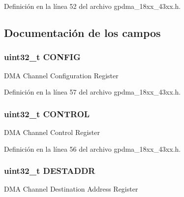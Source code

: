 Definición en la línea 52 del archivo gpdma\+\_\+18xx\+\_\+43xx.\+h.



\subsection{Documentación de los campos}
\subsubsection[{\texorpdfstring{C\+O\+N\+F\+IG}{CONFIG}}]{ uint32\+\_\+t C\+O\+N\+F\+IG}\hypertarget{struct_g_p_d_m_a___c_h___t_aed40378e2ce292435df51ff247d0cb78}{}\label{struct_g_p_d_m_a___c_h___t_aed40378e2ce292435df51ff247d0cb78}
D\+MA Channel Configuration Register 

Definición en la línea 57 del archivo gpdma\+\_\+18xx\+\_\+43xx.\+h.

\subsubsection[{\texorpdfstring{C\+O\+N\+T\+R\+OL}{CONTROL}}]{ uint32\+\_\+t C\+O\+N\+T\+R\+OL}\hypertarget{struct_g_p_d_m_a___c_h___t_a60054d9772af540ff3d88432d724137f}{}\label{struct_g_p_d_m_a___c_h___t_a60054d9772af540ff3d88432d724137f}
D\+MA Channel Control Register 

Definición en la línea 56 del archivo gpdma\+\_\+18xx\+\_\+43xx.\+h.

\subsubsection[{\texorpdfstring{D\+E\+S\+T\+A\+D\+DR}{DESTADDR}}]{ uint32\+\_\+t D\+E\+S\+T\+A\+D\+DR}\hypertarget{struct_g_p_d_m_a___c_h___t_a6607f2a52135b9e1099acccd6dc2226b}{}\label{struct_g_p_d_m_a___c_h___t_a6607f2a52135b9e1099acccd6dc2226b}
D\+MA Channel Destination Address Register 

